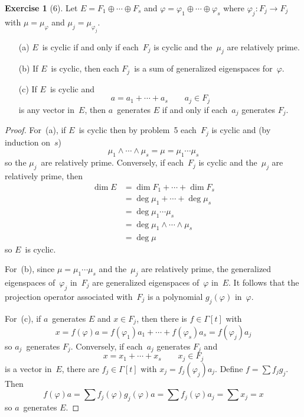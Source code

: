 \documentclass[letterpaper,12pt]{article}
\newcommand{\meet}{\wedge}
\newcommand{\dsum}{\oplus}
\theoremstyle{definition}
\newtheorem*{exer}{Exercise}
\theoremstyle{remark}
\begin{document}
\begin{exer}[6]
Let \(E=F_1\dsum\cdots\dsum F_s\) and \(\varphi=\varphi_1\dsum\cdots\dsum\varphi_s\) where \(\varphi_j:F_j\to F_j\) with \(\mu=\mu_{\varphi}\) and \(\mu_j=\mu_{\varphi_j}\).
\begin{enumerate}
\item[(a)] \(E\)~is cyclic if and only if each~\(F_j\) is cyclic and the~\(\mu_j\) are relatively prime.
\item[(b)] If \(E\)~is cyclic, then each \(F_j\)~is a sum of generalized eigenspaces for~\(\varphi\).
\item[(c)] If \(E\)~is cyclic and
\[a=a_1+\cdots+a_s\qquad a_j\in F_j\]
is any vector in~\(E\), then \(a\)~generates \(E\) if and only if each~\(a_j\) generates \(F_j\).
\end{enumerate}
\end{exer}
\begin{proof}
For~(a), if \(E\)~is cyclic then by problem~5 each~\(F_j\) is cyclic and (by induction on~\(s\))
\[\mu_1\meet\cdots\meet\mu_s=\mu=\mu_1\cdots\mu_s\]
so the \(\mu_j\)~are relatively prime. Conversely, if each~\(F_j\) is cyclic and the~\(\mu_j\) are relatively prime, then
\begin{align*}
\dim E&=\dim F_1+\cdots+\dim F_s\\
	&=\deg\mu_1+\cdots+\deg\mu_s\\
	&=\deg\mu_1\cdots\mu_s\\
	&=\deg\mu_1\meet\cdots\meet\mu_s\\
	&=\deg\mu
\end{align*}
so \(E\)~is cyclic.

For~(b), since \(\mu=\mu_1\cdots\mu_s\) and the~\(\mu_j\) are relatively prime, the generalized eigenspaces of~\(\varphi_j\) in~\(F_j\) are generalized eigenspaces of~\(\varphi\) in~\(E\). It follows that the projection operator associated with~\(F_j\) is a polynomial \(g_j(\varphi)\) in~\(\varphi\).

For~(c), if \(a\)~generates \(E\) and \(x\in F_j\), then there is \(f\in\Gamma[t]\) with
\[x=f(\varphi)a=f(\varphi_1)a_1+\cdots+f(\varphi_s)a_s=f(\varphi_j)a_j\]
so \(a_j\)~generates \(F_j\). Conversely, if each~\(a_j\) generates \(F_j\) and
\[x=x_1+\cdots+x_s\qquad x_j\in F_j\]
is a vector in~\(E\), there are \(f_j\in\Gamma[t]\) with \(x_j=f_j(\varphi_j)a_j\). Define \(f=\sum f_jg_j\). Then
\[f(\varphi)a=\sum f_j(\varphi)g_j(\varphi)a=\sum f_j(\varphi)a_j=\sum x_j=x\]
so \(a\)~generates \(E\).
\end{proof}
\end{document}
